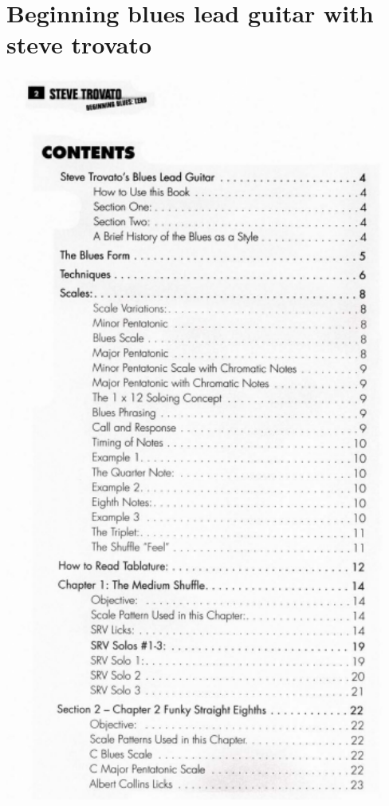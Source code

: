 \documentclass[a4paper]{book}
\begin{document}
\clearpage


\section[Beginning blues lead guitar with steve trovato]{Beginning
blues lead guitar with steve trovato}
\hypertarget{RefHeadingToc116973218262}{}




\begin{center}
\includegraphics[width=12.488cm,height=24.012cm]{lebluessupportsmethodes-img52.png}
\end{center}
\end{document}
